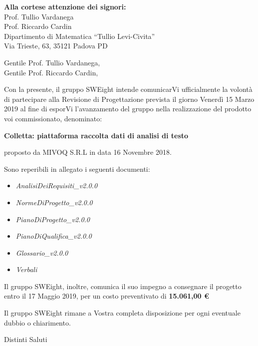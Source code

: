 \documentclass[11pt]{brownletter}
\date{Padova, 08 Marzo 2019} %
\newcommand{\AdR}{\emph{AnalisiDeiRequisiti\_v2.0.0}}
\newcommand{\NdP}{\emph{NormeDiProgetto\_v2.0.0}}
\newcommand{\PdP}{\emph{PianoDiProgetto\_v2.0.0}}
\newcommand{\PdQ}{\emph{PianoDiQualifica\_v2.0.0}}
\newcommand{\G}{\emph{Glossario\_v2.0.0}}
\begin{document}
\begin{letter}{\textbf{Alla cortese attenzione dei signori:}\\
	Prof. Tullio Vardanega\\
	Prof. Riccardo Cardin\\
	Dipartimento di Matematica “Tullio Levi-Civita”\\
	Via Trieste, 63, 35121 Padova PD}

\opening{	Gentile Prof. Tullio Vardanega,\\
			Gentile Prof. Riccardo Cardin,\\}

Con la presente, il gruppo SWEight intende comunicarVi ufficialmente la volontà di partecipare  alla Revisione di Progettazione prevista il giorno Venerdì 15 Marzo 2019 al fine di esporVi l’avanzamento del gruppo nella realizzazione del prodotto voi commissionato, denominato:
\begin{center}
	\textbf{Colletta: piattaforma raccolta dati di analisi di testo}
\end{center}
proposto da MIVOQ S.R.L in data 16 Novembre 2018.

Sono reperibili in allegato i seguenti documenti:
\begin{itemize}
	\item \AdR
	\item \NdP
	\item \PdP
	\item \PdQ
	\item \G
	\item \emph{Verbali}
\end{itemize}
Il gruppo SWEight, inoltre, comunica il suo impegno a consegnare il progetto entro il 17 Maggio 2019, per un costo preventivato di \textbf{15.061,00 \euro}

Il gruppo SWEight rimane a Vostra completa disposizione per ogni eventuale dubbio o chiarimento.
\closing{Distinti Saluti}

\end{letter}
\end{document}
